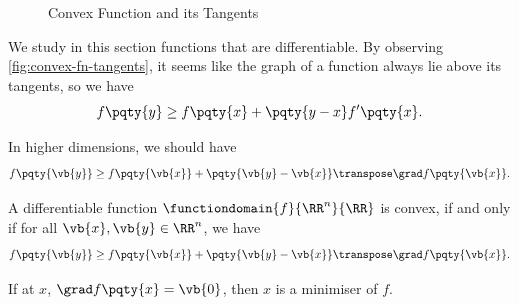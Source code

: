 \begin{figure}[ht!]
    \centering

    \caption{Convex Function and its Tangents}
    \label{fig:convex-fn-tangents}
\end{figure}

We study in this section functions that are differentiable. By observing \autoref{fig:convex-fn-tangents}, it seems like the graph of a function always lie above its tangents, so we have
\[
    f\pqty{y} \geq f\pqty{x} + \pqty{y - x} f'\pqty{x}.
\]

In higher dimensions, we should have
\[
    f\pqty{\vb{y}} \geq f\pqty{\vb{x}} + \pqty{\vb{y} - \vb{x}} \transpose \grad f\pqty{\vb{x}}.
\]

\begin{theorem}
    \label{thm:first-order-condition}%
    A differentiable function \(\functiondomain{f}{\RR^n}{\RR}\) is convex, if and only if for all \(\vb{x}, \vb{y} \in \RR^n\), we have
    \[
        f\pqty{\vb{y}} \geq f\pqty{\vb{x}} + \pqty{\vb{y} - 
        \vb{x}}\transpose \grad f\pqty{\vb{x}}.
    \]  
\end{theorem}

\begin{remark}
    If at \(x\), \(\grad f\pqty{x} = \vb{0}\), then \(x\) is a minimiser of \(f\).
\end{remark}

